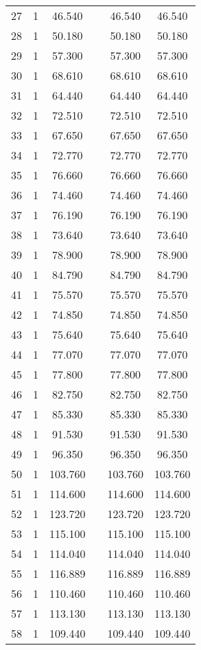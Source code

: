 \begin{table}[!htbp]
\begin{tabular}{@{\extracolsep{5pt}}lccccc}
27 & 1 & 46.540 &  & 46.540 & 46.540 \\ 
28 & 1 & 50.180 &  & 50.180 & 50.180 \\ 
29 & 1 & 57.300 &  & 57.300 & 57.300 \\ 
30 & 1 & 68.610 &  & 68.610 & 68.610 \\ 
31 & 1 & 64.440 &  & 64.440 & 64.440 \\ 
32 & 1 & 72.510 &  & 72.510 & 72.510 \\ 
33 & 1 & 67.650 &  & 67.650 & 67.650 \\ 
34 & 1 & 72.770 &  & 72.770 & 72.770 \\ 
35 & 1 & 76.660 &  & 76.660 & 76.660 \\ 
36 & 1 & 74.460 &  & 74.460 & 74.460 \\ 
37 & 1 & 76.190 &  & 76.190 & 76.190 \\ 
38 & 1 & 73.640 &  & 73.640 & 73.640 \\ 
39 & 1 & 78.900 &  & 78.900 & 78.900 \\ 
40 & 1 & 84.790 &  & 84.790 & 84.790 \\ 
41 & 1 & 75.570 &  & 75.570 & 75.570 \\ 
42 & 1 & 74.850 &  & 74.850 & 74.850 \\ 
43 & 1 & 75.640 &  & 75.640 & 75.640 \\ 
44 & 1 & 77.070 &  & 77.070 & 77.070 \\ 
45 & 1 & 77.800 &  & 77.800 & 77.800 \\ 
46 & 1 & 82.750 &  & 82.750 & 82.750 \\ 
47 & 1 & 85.330 &  & 85.330 & 85.330 \\ 
48 & 1 & 91.530 &  & 91.530 & 91.530 \\ 
49 & 1 & 96.350 &  & 96.350 & 96.350 \\ 
50 & 1 & 103.760 &  & 103.760 & 103.760 \\ 
51 & 1 & 114.600 &  & 114.600 & 114.600 \\ 
52 & 1 & 123.720 &  & 123.720 & 123.720 \\ 
53 & 1 & 115.100 &  & 115.100 & 115.100 \\ 
54 & 1 & 114.040 &  & 114.040 & 114.040 \\ 
55 & 1 & 116.889 &  & 116.889 & 116.889 \\ 
56 & 1 & 110.460 &  & 110.460 & 110.460 \\ 
57 & 1 & 113.130 &  & 113.130 & 113.130 \\ 
58 & 1 & 109.440 &  & 109.440 & 109.440 \\ 

\end{tabular}
\end{table}
